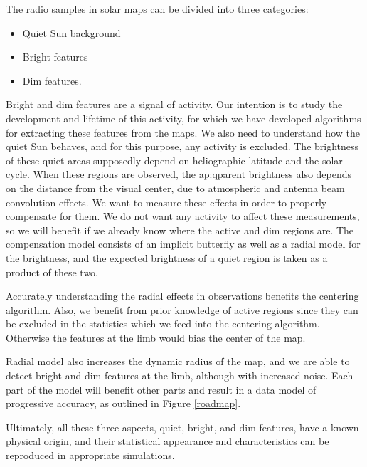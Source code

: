 \documentclass{aa}
\begin{document}
The radio samples in solar maps can be divided into three categories: \begin{itemize} \item Quiet Sun background \item 
Bright features \item Dim features. \end{itemize} Bright and dim features are a signal of activity. Our intention is to 
study the development and lifetime of this activity, for which we have developed algorithms for extracting these 
features from the maps. We also need to understand how the quiet Sun behaves, and for this purpose, any activity is 
excluded. The brightness of these quiet areas supposedly depend on heliographic latitude and the solar cycle. When these 
regions are observed, the ap:qparent brightness also depends on the distance from the visual center, due to atmospheric 
and antenna beam convolution effects. We want to measure these effects in order to properly compensate for them. We do 
not want any activity to affect these measurements, so we will benefit if we already know where the active and dim 
regions are. The compensation model consists of an implicit butterfly as well as a radial model for the brightness, and 
the expected brightness of a quiet region is taken as a product of these two.

Accurately understanding the radial effects in observations benefits the centering algorithm. Also, we benefit from 
prior knowledge of active regions since they can be excluded in the statistics which we feed into the centering 
algorithm. Otherwise the features at the limb would bias the center of the map.

Radial model also increases the dynamic radius of the map, and we are able to detect bright and dim features at the 
limb, although with increased noise. Each part of the model will benefit other parts and result in a data model of progressive accuracy, as outlined in Figure \ref{roadmap}.

Ultimately, all these three aspects, quiet, bright, and dim features, have a known physical origin, and their 
statistical appearance and characteristics can be reproduced in appropriate simulations.
\end{document}
